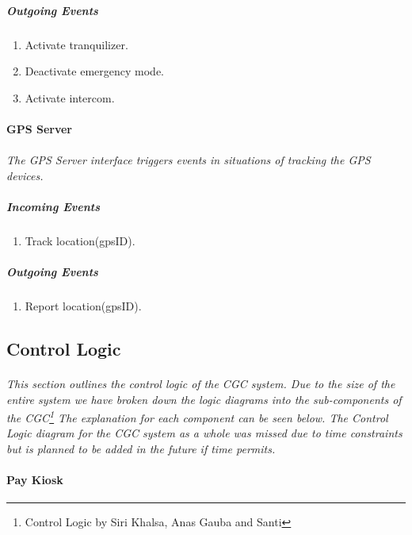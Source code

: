 \documentclass[12pt]{article}
\begin{document}
        \subparagraph{Outgoing Events}
        \begin{enumerate}
            \item Activate tranquilizer.
            \item Deactivate emergency mode.
            \item Activate intercom. 
        \end{enumerate}

    \paragraph{GPS Server}
    \paragraph{}\textit{The GPS Server interface triggers events in situations of tracking the GPS devices. }
        \subparagraph{Incoming Events}
        \begin{enumerate}
            \item Track location(gpsID).
        \end{enumerate}
                
        \subparagraph{Outgoing Events}
        \begin{enumerate}
            \item Report location(gpsID).
        \end{enumerate}						
        
    \subsection{Control Logic} \label{logic}%
    \paragraph{} \textit{ This section outlines the control logic of the CGC system. Due to the size of the entire system we have broken down the logic diagrams into the sub-components of the CGC\footnote{Control Logic by Siri Khalsa, Anas Gauba and Santi}
    The explanation for each component can be seen below. The Control Logic diagram for the CGC system as a whole was missed due to time constraints but is planned to be added in the future if time permits.}

    \paragraph{Pay Kiosk}
\end{document}
